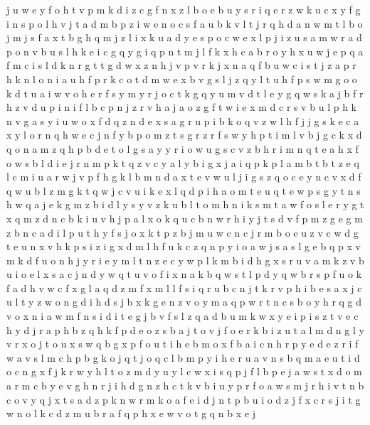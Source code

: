 \documentclass{article}
\begin{document}
j u w e y f o h t v p m k d i z
c g f n x z l b
o e b u y s r i
q e r z w k u c x y f g i n s p o l h v j t a d m b
p z i w e n o c s f a u b k v l t j r q h d
a n w m t l b o
j m
j s f a x
t b g h q m j z l i x k u a d y e s p o c w
e x l p j i z u s a m w
r a d p o n v b u s l h k e i c g q
y g i q p n t m j l f k x h c a b r
o y h x u w j e p q a f m c i s l d k n r g t
t g
d w x z n h j v
p v r k j x n a q
f b u w c i s t j z a p r h k n l o
n i a u h f p r k c o t d m w e x b v g s l j z q y
l t u h f p s w m g o
o k d t u a
i w v o h e r f s y
m y
r j o c t k g q y u m v
d t l
e y g q w s k a j b f r h z v d u p i n
i f l b c p n j z r v h a
j a o z g f t w i e x m d c r s v b u l p h k n
v g a s y i u w o x f d q z n
d e x s a g r u p i b k o q v z w l h f j
j g s k e c a x y l o r n
q h w e c j n f y b p o m z t s g r
z r f s w y h p t i m l v b j g c k x d q o n a
m z q h p b d e t o l g s a y
y r i o
w u g s c v z b h r i m n q t e a
h x f o w s b l d i e j r n m p k t q z v c y a
l y b i
g x j a i q p k
p l a m b t
b t z e q l c m i u a r w j v p f h g k
l
b m n d a x t e v w u l j i g s z q o c
e y n c v x d f q w u b l z m g k
t q w j c v u i k e x
l q d p i h a o m t e
u q t e w p s g y
t n s h w q a j e k g m z b i d l y
s y v z k u b l t o m h n i
k s m t
a w f o s l e r y g t x q m z d n c b k i u v h j p
a l x o k q u c b n w r h i y j t s d v f p m z g
e g m z b n c a d i l p u t h y f s j o x k
t p z b j m u w c n
c j r m b o e u z v
c w d g t e u n x v h k p s i z
i g x d m
l h f u k c z q n p y i o a w j s
a s l g e b q p x v m k d f u o n h j y r i
e y m l
t n z e c y w p l k m b i d h g x s r u v a
m k z v b u i o e l x s a c j n d y w q t
u v o f i x n a k b q w s t l p
d y q w b r s p f
u o k f a d h v w c
f x
g l a q d z m
f x m l
l f s i q r u b c n j t
k r v p h i b e s a x j c u l t y z w o n g d
i h d s j b x k g e n z v o y m a q p w r t
n c s b o
y h r q g d v o x n i a w
m f n s i d
i t e g j b
v f s l z q a d b u m k w x y e i p
i s z t v e c h y d j r a p
h b z q
h k f p d e o z s
b a j t o
v j f o e r k b i z u t a l m d
n g l y v r x o
j t o u x s w q b
g x p f o u t i h e b m
o x f b a i c n h r p y e
d e z r i f w a v s l m c h p b g k o j q t
j o q c l b m p y i h e r u a v n s
b q m a e u t i d o c n g x f j k r w y h l
t o z m d y
u y l c w x i s q p j
f
l b
p e j a w s t x d o m
a r m c b y e v g h n
r j i h
d g n z h c t k v b i u y p r f o a w s m j
r h i v t n
b c o
v y q j x t s a d z p k n w r m
k o a f e i d j
n t p b u
i o d z j f x c r
s j i t g w n o l k c d z m u b r a f q p h x e
w v o t g q n
b x e j
\end{document}
